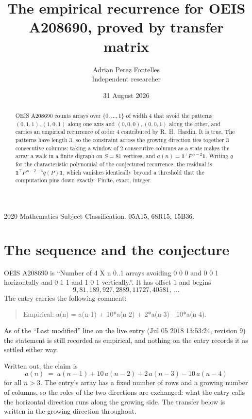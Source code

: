 \documentclass[11pt,a4paper]{article}
\title{The empirical recurrence for OEIS A208690, proved by transfer matrix}
\author{Adrian Perez Fontelles\\ \small Independent researcher}
\date{31 August 2026}
\theoremstyle{plain}
\theoremstyle{definition}
\begin{document}
\maketitle

\begin{abstract}
OEIS A208690 counts arrays over $\{0,\dots,1\}$ of width $4$ that avoid the patterns
$(0,1,1), (1,0,1)$ along one axis and $(0,0,0), (0,0,1)$ along the other, and carries an empirical recurrence of
order $4$ contributed by R.~H.~Hardin. It is true. The patterns have length $3$, so
the constraint across the growing direction ties together $3$ consecutive columns: taking a
window of $2$ consecutive columns as a state makes the array a walk in a finite digraph
on $S=81$ vertices, and $a(n)=\mathbf{1}^{\!\top}P^{\,n-2}\mathbf{1}$. Writing $q$
for the characteristic polynomial of the conjectured recurrence, the residual is
$\mathbf{1}^{\!\top}P^{\,n-2-4}q(P)\mathbf{1}$, which vanishes identically
beyond a threshold that the computation pins down exactly. Finite, exact, integer.
\end{abstract}

\noindent\small 2020 Mathematics Subject Classification. 05A15, 68R15, 15B36.\normalsize

\section{The sequence and the conjecture}

OEIS A208690 is ``Number of 4 X n 0..1 arrays avoiding 0 0 0 and 0 0 1 horizontally and 0 1 1 and 1 0 1 vertically.''. It has offset
$1$ and begins
\[
9, 81, 189, 927, 2889, 11727, 40581,\ \dots
\]
The entry carries the following comment:
\begin{quote}\small
Empirical: a(n) = a(n-1) + 10*a(n-2) + 2*a(n-3) - 10*a(n-4).
\end{quote}
As of the ``Last modified'' line on the live entry (Jul 05 2018 13:53:24, revision
9) the statement is still recorded as empirical, and nothing on the entry
records it as settled either way.

Written out, the claim is
\begin{equation}\label{eq:conj}
a(n)\;=\;a(n-1) + 10\,a(n-2) + 2\,a(n-3) - 10\,a(n-4)
\end{equation}
for all $n>3$. The entry's array has a fixed number of rows and a growing number of
columns, so the roles of the two directions are exchanged: what the entry calls the
horizontal direction runs along the growing side. The transfer below is written in the
growing direction throughout.
\end{document}
